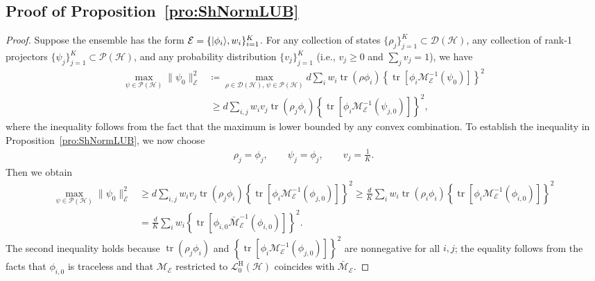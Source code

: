 \documentclass[aps,pra,twocolumn,nofootinbib,superscriptaddress,10pt]{revtex4-2}
\DeclarePairedDelimiter{\ket}{\lvert}{\rangle}
\DeclareMathOperator{\tr}{tr}
\newcommand{\caD}{\mathcal{D}}
\newcommand{\caE}{\mathcal{E}}
\newcommand{\caH}{\mathcal{H}}
\newcommand{\caL}{\mathcal{L}}
\newcommand{\caM}{\mathcal{M}}
\newcommand{\caP}{\mathcal{P}}
\newcommand{\rmH}{\mathrm{H}}
\newcommand{\bcaM}{\bar{\mathcal{M}}}
\newcommand{\pref}[1]{Proposition~\ref{#1}}
\begin{document}
\subsection{Proof of \pref{pro:ShNormLUB}}
\label{sec:pro:ShNormLUBProof}
\begin{proof}
Suppose the ensemble has the form $\caE=\{\ket{\phi_i},w_i\}_{i=1}^{K}$. For any collection of states $\{\rho_j\}_{j=1}^K \subset \caD(\caH)$, any collection of rank-1 projectors $\{\psi_j\}_{j=1}^K \subset \caP(\caH)$, and any probability distribution $\{v_j\}_{j=1}^K$ (i.e., $v_j \ge 0$ and $\sum_j v_j = 1$), we have
\begin{align}
\max_{\psi\in \caP(\caH)} \|\psi_0\|_\caE^2
&\coloneqq \max_{\rho\in \caD(\caH),\,\psi\in \caP(\caH)} d\sum_i w_i\tr(\rho \phi_i) \left\{\tr\left[\phi_i\caM_\caE^{-1}(\psi_0) \right]\right\}^2 \nonumber\\
&\,\ge d\sum_{i,j} w_i v_j{\tr(\rho_j \phi_i) \left\{\tr\left[\phi_i\caM_\caE^{-1}(\psi_{j,0}) \right]\right\}^2}, \label{eq:LBK}
\end{align}
where the inequality follows from the fact that the maximum is lower bounded by any convex combination. To establish the inequality in \pref{pro:ShNormLUB}, we now choose
\begin{align}
\rho_j=\phi_j, \qquad \psi_{j}=\phi_j, \qquad v_j=\frac{1}{K}.
\end{align}
Then we obtain
\begin{align}
\max_{\psi\in \caP(\caH)} \|\psi_0\|_\caE^2
&\ge d\sum_{i,j} w_i v_j \tr(\rho_j \phi_i) \left\{\tr\left[\phi_i\caM_\caE^{-1}(\phi_{j,0}) \right]\right\}^2 \ge \frac{d}{K}\sum_i w_i \tr(\rho_i \phi_i) \left\{\tr\left[\phi_i\caM_\caE^{-1}(\phi_{i,0}) \right]\right\}^2 \nonumber\\
&= \frac{d}{K}\sum_i w_i \left\{\tr\left[\phi_{i,0}\bcaM_\caE^{-1}(\phi_{i,0}) \right]\right\}^2.\label{eq:LBIC}
\end{align}
The second inequality holds because $\tr(\rho_j\phi_i)$ and $\left\{\tr\left[\phi_i\caM_\caE^{-1}(\phi_{j,0}) \right]\right\}^2$ are nonnegative for all $i,j$; the equality follows from the facts that $\phi_{i,0}$ is traceless and that $\caM_\caE$ restricted to $\caL^{\rmH}_0(\caH)$ coincides with $\bcaM_\caE$.


\end{proof}
\end{document}
